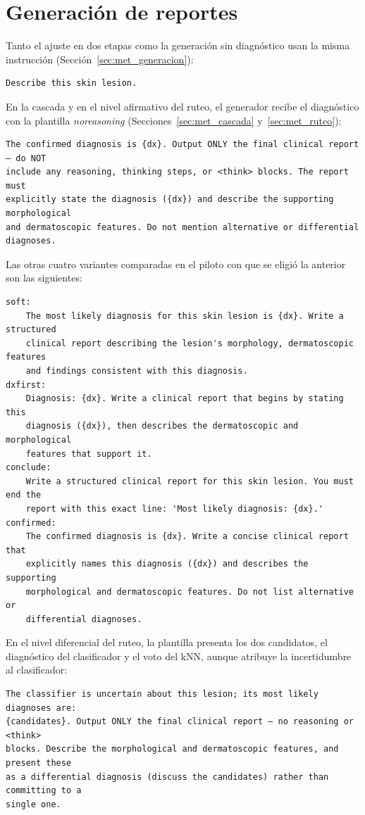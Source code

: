 \section{Generación de reportes}

Tanto el ajuste en dos etapas como la generación sin diagnóstico usan la misma instrucción
(Sección~\ref{sec:met_generacion}):
\begin{verbatim}
Describe this skin lesion.
\end{verbatim}

En la cascada y en el nivel afirmativo del ruteo, el generador recibe el diagnóstico con la plantilla
\emph{noreasoning} (Secciones~\ref{sec:met_cascada} y~\ref{sec:met_ruteo}):
\begin{verbatim}
The confirmed diagnosis is {dx}. Output ONLY the final clinical report — do NOT
include any reasoning, thinking steps, or <think> blocks. The report must
explicitly state the diagnosis ({dx}) and describe the supporting morphological
and dermatoscopic features. Do not mention alternative or differential
diagnoses.
\end{verbatim}

Las otras cuatro variantes comparadas en el piloto con que se eligió la anterior son las siguientes:
\begin{verbatim}
soft:
    The most likely diagnosis for this skin lesion is {dx}. Write a structured
    clinical report describing the lesion's morphology, dermatoscopic features
    and findings consistent with this diagnosis.
dxfirst:
    Diagnosis: {dx}. Write a clinical report that begins by stating this
    diagnosis ({dx}), then describes the dermatoscopic and morphological
    features that support it.
conclude:
    Write a structured clinical report for this skin lesion. You must end the
    report with this exact line: 'Most likely diagnosis: {dx}.'
confirmed:
    The confirmed diagnosis is {dx}. Write a concise clinical report that
    explicitly names this diagnosis ({dx}) and describes the supporting
    morphological and dermatoscopic features. Do not list alternative or
    differential diagnoses.
\end{verbatim}

En el nivel diferencial del ruteo, la plantilla presenta los dos candidatos, el diagnóstico del clasificador y el
voto del kNN, aunque atribuye la incertidumbre al clasificador:
\begin{verbatim}
The classifier is uncertain about this lesion; its most likely diagnoses are:
{candidates}. Output ONLY the final clinical report — no reasoning or <think>
blocks. Describe the morphological and dermatoscopic features, and present these
as a differential diagnosis (discuss the candidates) rather than committing to a
single one.
\end{verbatim}

